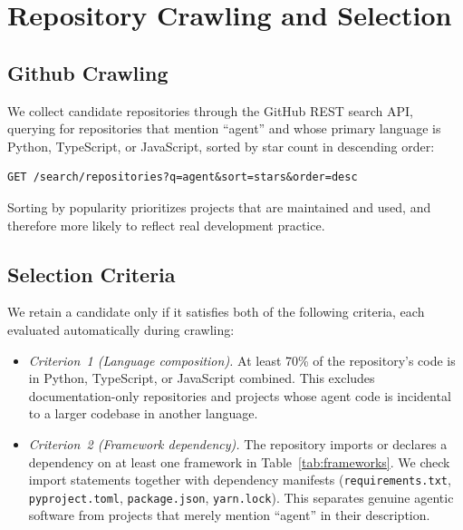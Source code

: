 \section{Repository Crawling and Selection}
\subsection{Github Crawling}

We collect candidate repositories through the GitHub REST search API, querying for repositories that mention ``agent'' and whose primary language is Python, TypeScript, or JavaScript, sorted by star count in descending order:
 
\begin{scriptsize}
\begin{verbatim}
GET /search/repositories?q=agent&sort=stars&order=desc
\end{verbatim}
\end{scriptsize}

Sorting by popularity prioritizes projects that are maintained and used, and therefore more likely to reflect real development practice. 

\subsection{Selection Criteria}

We retain a candidate only if it satisfies both of the following criteria, each evaluated automatically during crawling:
 
\begin{itemize}
\item \emph{Criterion~1 (Language composition).} At least 70\% of the repository's code is in Python, TypeScript, or JavaScript combined. This excludes documentation-only repositories and projects whose agent code is incidental to a larger codebase in another language.
\item \emph{Criterion~2 (Framework dependency).} The repository imports or declares a dependency on at least one framework in Table~\ref{tab:frameworks}. We check import statements together with dependency manifests (\texttt{requirements.txt}, \texttt{pyproject.toml}, \texttt{package.json}, \texttt{yarn.lock}). This separates genuine agentic software from projects that merely mention ``agent'' in their description.
\end{itemize}

